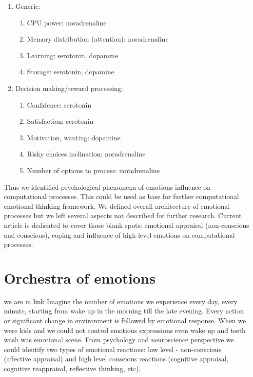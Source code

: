 \begin{enumerate}
\item  Generic:
\begin{enumerate}
\item  CPU power: noradrenaline
\item  Memory distribution (attention): noradrenaline
\item  Learning: serotonin, dopamine
\item  Storage: serotonin, dopamine
\end{enumerate}
\item  Decision making/reward processing:
\begin{enumerate}
\item  Confidence: serotonin
\item  Satisfaction: serotonin
\item  Motivation, wanting: dopamine
\item  Risky choices inclination: noradrenaline
\item  Number of options to process: noradrenaline
\end{enumerate}
\end{enumerate}

Thus we identified psychological phenomena of emotions influence on computational processes. This could be used as base for further computational emotional thinking framework. We defined overall architecture of emotional processes but we left several aspects not described for further research. Current article is dedicated to cover those blank spots: emotional appraisal (non-conscious and conscious), coping and influence of high level emotions on computational processes.

\section{Orchestra of emotions}

we are in link
Imagine the number of emotions we experience every day, every minute, starting from wake up in the morning till the late evening. Every action or significant change in environment is followed by emotional response. When we were kids and we could not control emotions expressions even wake up and teeth wash was emotional scene. From psychology and neuroscience perspective \cite{emotionsbraintorobot, neuromodulatory, natureofemotions, primer_affect_psychology} we could identify two types of emotional reactions: low level - non-conscious (affective appraisal) and high level conscious reactions (cognitive appraisal, cognitive reappraisal, reflective thinking, etc).



